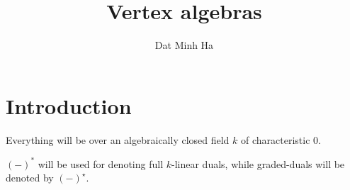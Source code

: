 

\setcounter{section}{-1}





    \title{Vertex algebras}
    
    \author{Dat Minh Ha}
    \maketitle
    
    \begin{abstract}
        
    \end{abstract}
    
    {
      \hypersetup{} 
      \tableofcontents %
    }

    \section{Introduction}
        \begin{convention}
            Everything will be over an algebraically closed field $k$ of characteristic $0$.
            
            $(-)^*$ will be used for denoting full $k$-linear duals, while graded-duals will be denoted by $(-)^{\star}$.
        \end{convention}

    

    

    \begin{appendices}
        
    \end{appendices}
	
    \printbibliography

